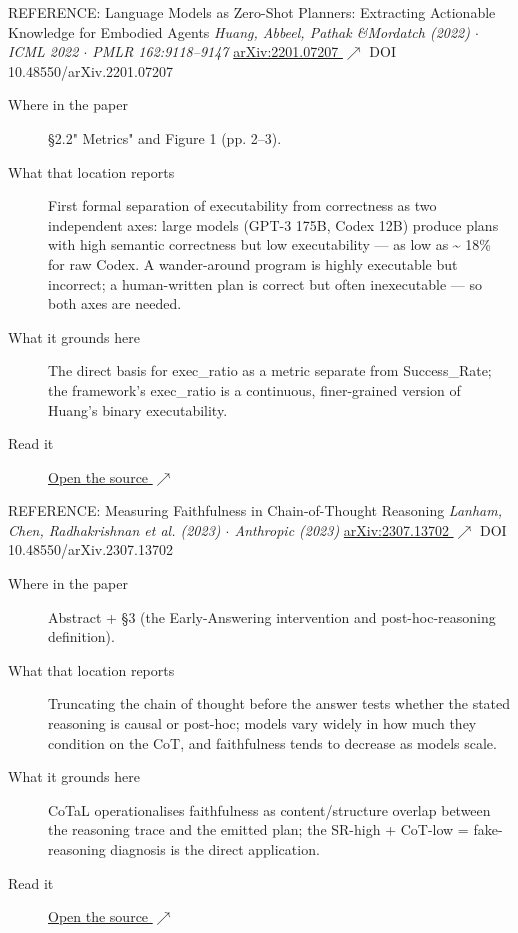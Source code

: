 \begin{bmmcard}{REFERENCE: Language Models as Zero-Shot Planners: Extracting Actionable Knowledge for Embodied Agents}
\emph{Huang, Abbeel, Pathak \&Mordatch (2022) \(\cdot\) ICML 2022 \(\cdot\) PMLR 162:9118--9147}
\href{https://proceedings.mlr.press/v162/huang22a.html}{arXiv:2201.07207 \(\nearrow\)} DOI 10.48550/arXiv.2201.07207
\begin{description}
\item[Where in the paper] \S{}2.2" Metrics" and Figure 1 (pp. 2--3).
\item[What that location reports] First formal separation of executability from correctness as two independent axes: large models (GPT-3 175B, Codex 12B) produce plans with high semantic correctness but low executability --- as low as \textasciitilde{} 18\% for raw Codex. A wander-around program is highly executable but incorrect; a human-written plan is correct but often inexecutable --- so both axes are needed.
\item[What it grounds here] The direct basis for exec\_ratio as a metric separate from Success\_Rate; the framework's exec\_ratio is a continuous, finer-grained version of Huang's binary executability.
\item[Read it] \href{https://proceedings.mlr.press/v162/huang22a.html}{Open the source \(\nearrow\)}
\end{description}
\end{bmmcard}

\begin{bmmcard}{REFERENCE: Measuring Faithfulness in Chain-of-Thought Reasoning}
\emph{Lanham, Chen, Radhakrishnan et al. (2023) \(\cdot\) Anthropic (2023)}
\href{https://arxiv.org/abs/2307.13702}{arXiv:2307.13702 \(\nearrow\)} DOI 10.48550/arXiv.2307.13702
\begin{description}
\item[Where in the paper] Abstract + \S{}3 (the Early-Answering intervention and post-hoc-reasoning definition).
\item[What that location reports] Truncating the chain of thought before the answer tests whether the stated reasoning is causal or post-hoc; models vary widely in how much they condition on the CoT, and faithfulness tends to decrease as models scale.
\item[What it grounds here] CoTaL operationalises faithfulness as content/structure overlap between the reasoning trace and the emitted plan; the SR-high + CoT-low = fake-reasoning diagnosis is the direct application.
\item[Read it] \href{https://arxiv.org/abs/2307.13702}{Open the source \(\nearrow\)}
\end{description}
\end{bmmcard}

